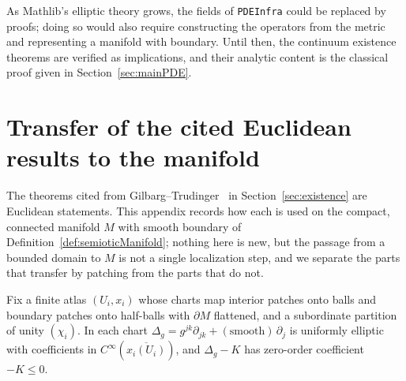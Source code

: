 \documentclass[11pt]{article}
\theoremstyle{plain}
\theoremstyle{definition}
\theoremstyle{remark}
\begin{document}
As Mathlib's elliptic theory grows, the fields of \texttt{PDEInfra} could be replaced by proofs; doing so would also require constructing the operators from the metric and representing a manifold with boundary. Until then, the continuum existence theorems are verified as implications, and their analytic content is the classical proof given in Section~\ref{sec:mainPDE}.

\section{Transfer of the cited Euclidean results to the manifold}\label{app:transfer}
The theorems cited from Gilbarg--Trudinger~\cite{GilbargTrudinger2001} in Section~\ref{sec:existence} are Euclidean statements. This appendix records how each is used on the compact, connected manifold \(M\) with smooth boundary of Definition~\ref{def:semioticManifold}; nothing here is new, but the passage from a bounded domain to \(M\) is not a single localization step, and we separate the parts that transfer by patching from the parts that do not.

Fix a finite atlas \((U_i,x_i)\) whose charts map interior patches onto balls and boundary patches onto half-balls with \(\partial M\) flattened, and a subordinate partition of unity \((\chi_i)\). In each chart \(\Delta_g=g^{jk}\partial_{jk}+(\text{smooth})\,\partial_j\) is uniformly elliptic with coefficients in \(C^\infty(\overline{x_i(U_i)})\), and \(\Delta_g-K\) has zero-order coefficient \(-K\le 0\).
\end{document}
